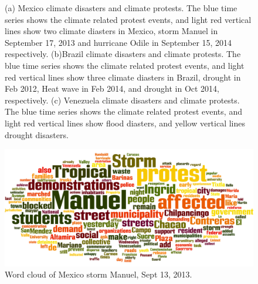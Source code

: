 \documentclass[9pt,twocolumn,twoside]{pnas-new}
\begin{document}
\begin{figure}[ht]
	\centering
	\caption{(a) Mexico climate disasters and climate protests. The blue time series shows the climate related protest events, and light red vertical lines show two climate diasters in Mexico, storm Manuel in September 17, 2013 and hurricane Odile in September 15, 2014 respectively. (b)Brazil climate disasters and climate protests. The blue time series shows the climate related protest events, and light red vertical lines show three climate diasters in Brazil, drought in Feb 2012, Heat wave in Feb 2014, and drought in Oct 2014, respectively. (c) Venezuela climate disasters and climate protests. The blue time series shows the climate related protest events, and light red vertical lines show flood diasters, and yellow vertical lines drought disasters.}
\label{climate-timeseries}
\end{figure}



\begin{figure}[ht]
\centerline
{\includegraphics[width=.3\textwidth]{figures/Mexico_Manuel_wordcloud}}
\caption{Word cloud of Mexico storm Manuel, Sept 13, 2013.}
\label{Manuel_word_cloud}
\end{figure}
\end{document}
